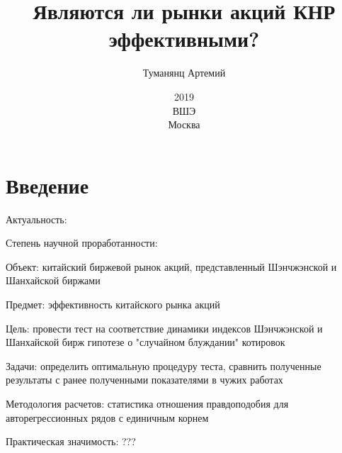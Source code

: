 ﻿\documentclass[a4paper,12pt]{article}
\title{Являются ли рынки акций КНР эффективными?}
\author{Туманянц Артемий}
\date{2019\\ВШЭ\\Москва}
\begin{document}
\maketitle
\newpage
\tableofcontents
\newpage
\section{Введение}
Актуальность:

Степень научной проработанности:

Объект: китайский биржевой рынок акций, представленный Шэнчжэнской и Шанхайской биржами

Предмет: эффективность китайского рынка акций

Цель: провести тест на соответствие динамики индексов Шэнчжэнской и Шанхайской бирж гипотезе о "случайном блуждании" котировок

Задачи: определить оптимальную процедуру теста, сравнить полученные результаты с ранее полученными показателями в чужих работах

Методология расчетов: статистика отношения правдоподобия для авторегрессионных рядов с единичным корнем

Практическая значимость: ???
\end{document}
